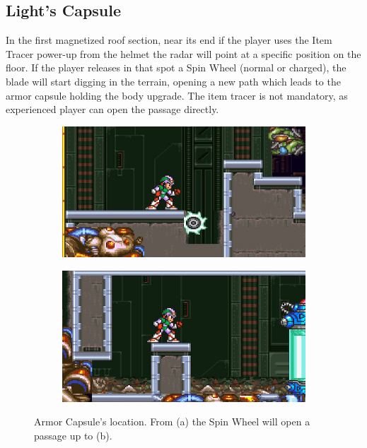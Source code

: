 \subsection{Light's Capsule}\label{X2:Body_parts}
In the first magnetized roof section, near its end if the player uses the Item Tracer power-up from the helmet the radar will point at a specific position on the floor. If the player releases in that spot a Spin Wheel (normal or charged), the blade will start digging in the terrain, opening a new path which leads to the armor capsule holding the body upgrade. The item tracer is not mandatory, as experienced player can open the passage directly.
\begin{figure}[htp]
	\centering
	\begin{subfigure}{0.4\linewidth}
		\centering
		\includegraphics[width=\linewidth]{figures/X2/Morph_moth/Moth_capsule_1.jpg}	
		\caption{}
	\end{subfigure}
	\begin{subfigure}{0.4\linewidth}
		\centering
		\includegraphics[width=\linewidth]{figures/X2/Morph_moth/Moth_capsule_2.jpg}
		\caption{}	
	\end{subfigure}
	\caption{Armor Capsule's location. From (a) the Spin Wheel will open a passage up to (b).}
\end{figure}



